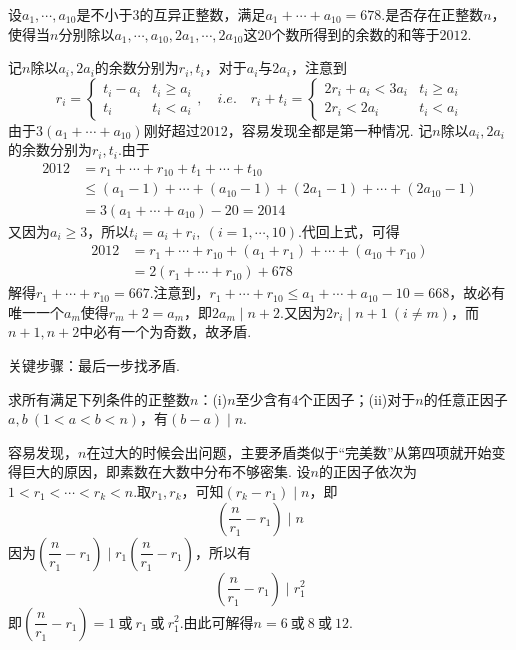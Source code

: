 \documentclass[cn,hazy,black,10pt,normal]{elegantnote}
\newenvironment{guess}{
  \color{guess}}{\newline \color{black}}
\newcommand{\cor}{~\textit{或}~}
\newcommand{\ssb}[1]{\left( #1 \right)}
\begin{document}
\begin{problem} %
	设$a_1, \cdots ,a_{10}$是不小于$3$的互异正整数，满足$a_1+ \cdots + a_{10}=678$.是否存在正整数$n$，使得当$n$分别除以$a_1, \cdots ,a_{10},2a_1, \cdots ,2a_{10}$这$20$个数所得到的余数的和等于$2012$.
\end{problem}
\begin{solution}
	\begin{guess}
		记$n$除以$a_i,2a_i$的余数分别为$r_i,t_i$，对于$a_i$与$2a_i$，注意到$$r_i=\begin{cases}
			t_i-a_i &t_i \geq a_i \\
			t_i &t_i < a_i
		\end{cases},\quad i.e. \quad r_i+t_i=\begin{cases}
			2r_i+a_i<3a_i &t_i \geq a_i \\
			2r_i<2a_i &t_i < a_i
		\end{cases}$$
		由于$3(a_1+ \cdots + a_{10})$刚好超过$2012$，容易发现全都是第一种情况.
	\end{guess}
	记$n$除以$a_i,2a_i$的余数分别为$r_i,t_i$.由于
	\begin{align*}
		2012&=r_1+ \cdots + r_{10} + t_1 + \cdots + t_{10} \\
		&\leq (a_1-1)+ \cdots + (a_{10}-1)+(2a_1-1)+ \cdots + (2a_{10}-1) \\
		&=3(a_1+ \cdots + a_{10})-20=2014
	\end{align*}
	又因为$a_i \geq 3$，所以$t_i=a_i+r_i,~(i=1, \cdots ,10)$.代回上式，可得
	\begin{align*}
		2012 &= r_1+ \cdots + r_{10} + (a_1+r_1) + \cdots + (a_{10}+r_{10}) \\
		&= 2(r_1 + \cdots + r_{10}) + 678
	\end{align*}
	解得$r_1 + \cdots + r_{10}=667$.注意到，$r_1 + \cdots + r_{10} \leq a_1+ \cdots + a_{10}-10=668$，故必有唯一一个$a_m$使得$r_m+2=a_m$，即$2a_m\mid n+2$.又因为$2r_i\mid n+1~(i \neq m)$，而$n+1,n+2$中必有一个为奇数，故矛盾.
\end{solution}
\begin{remark}
	关键步骤：最后一步找矛盾.
\end{remark}

\begin{cproblem} %
	求所有满足下列条件的正整数$n$：(i)$n$至少含有$4$个正因子；(ii)对于$n$的任意正因子$a,b~(1<a<b<n)$，有$(b-a) \mid n$.
\end{cproblem}
\begin{solution}
	\begin{guess}
		容易发现，$n$在过大的时候会出问题，主要矛盾类似于“完美数”从第四项就开始变得巨大的原因，即素数在大数中分布不够密集.
	\end{guess}
	设$n$的正因子依次为$1<r_1< \cdots <r_k<n$.取$r_1,r_k$，可知$(r_k-r_1)\mid n$，即$$\ssb{ \frac{n}{r_1}-r_1 }\mid n$$
	因为$\ssb{ \dfrac{n}{r_1}-r_1 } \mid r_1\ssb{ \dfrac{n}{r_1}-r_1 }$，所以有$$\ssb{ \frac{n}{r_1}-r_1 }\mid r_1^2$$
	即$\ssb{ \dfrac{n}{r_1}-r_1}=1 \cor r_1 \cor r_1^2$.由此可解得$n=6 \cor 8 \cor 12$.
\end{solution}
\end{document}
